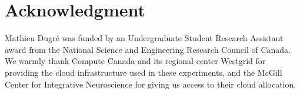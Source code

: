 \documentclass[conference]{IEEEtran}
\begin{document}
\section*{Acknowledgment}

Mathieu Dugr\'e was funded by an Undergraduate Student Research Assistant award from
the National Science and Engineering Research Council of Canada. We warmly thank
Compute Canada and its regional center Westgrid for providing the cloud infrastructure used in
these experiments, and the McGill Center for Integrative Neuroscience for giving us
access to their cloud allocation.



\end{document}
